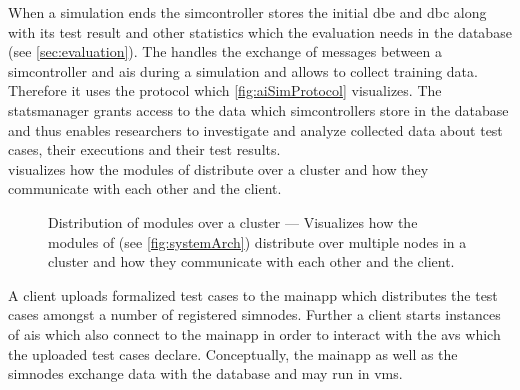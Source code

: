 When a simulation ends the \gls{simcontroller} stores the initial \gls{dbe} and \gls{dbc} along with its test result and other statistics which the evaluation needs in the database (see \cref{sec:evaluation}).
The \communicator{} handles the exchange of messages between a \gls{simcontroller} and \glspl{ai} during a simulation and allows to collect training data.
Therefore it uses the protocol which \cref{fig:aiSimProtocol} visualizes.
The \gls{statsmanager} grants access to the data which \glspl{simcontroller} store in the database and thus enables researchers to investigate and analyze collected data about test cases, their executions and their test results.\\
 visualizes how the modules of \drivebuild{} distribute over a cluster and how they communicate with each other and the client.
\begin{figure}
    \centering
    
    \medskip
    \caption{%
        Distribution of modules over a cluster --- Visualizes how the modules of \drivebuild{} (see \cref{fig:systemArch}) distribute over multiple nodes in a cluster and how they communicate with each other and the client.
    }\label{fig:distributeNodes}
\end{figure}
A client uploads formalized test cases to the \gls{mainapp} which distributes the test cases amongst a number of registered \glspl{simnode}.
Further a client starts instances of \glspl{ai} which also connect to the \gls{mainapp} in order to interact with the \glspl{av} which the uploaded test cases declare.
Conceptually, the \gls{mainapp} as well as the \glspl{simnode} exchange data with the database and may run in \glspl{vm}.

